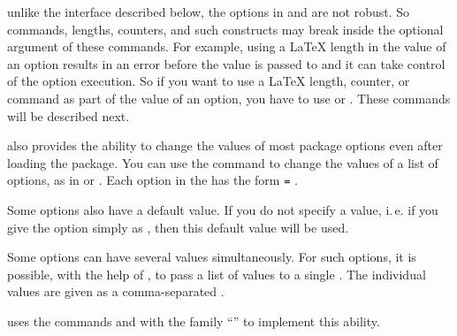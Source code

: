 %
unlike the interface described below, the options in  and
 are not robust. So commands, lengths, counters, and such
constructs may break inside the optional argument of these commands. For
example, using a \LaTeX{} length in the value of an option results in an error
before the value is passed to \KOMAScript{} and it can take control of the
option execution. So if you want to use a \LaTeX{} length, counter, or command
as part of the value of an option, you have to use
 or
. These commands will be described next.%
%
\EndIndexGroup


\begin{Declaration}
\end{Declaration}
\KOMAScript{} also
provides the ability to change the values of most
package options
even after loading the  package. You can use the  command to change the
values of a list of options, as in
 or
. Each option in the
 has the form \texttt{=}%
.

Some options also have a default value. If you do not specify a value, i.\,e.
if you give the option simply as , then this default value will
be used.

Some options can have several values simultaneously. For such options, it is
possible, with the help of , to pass a list of values to a
single . The individual values are given as a comma-separated
.

\begin{Explain}
  \KOMAScript{} uses the commands  and
   with the family ``'' to
  implement this ability.
\end{Explain}

